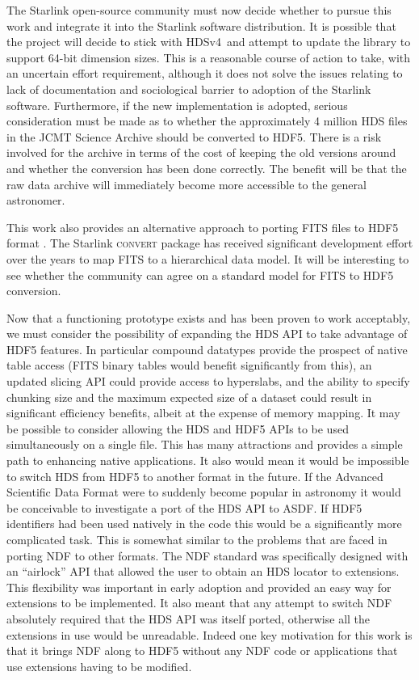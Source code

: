 \documentclass[final,authoryear,5p,times,twocolumn]{elsarticle}
\newcommand{\old}{HDSv4}
\begin{document}
The Starlink open-source community must now decide
whether to pursue this work and integrate it into the Starlink
software distribution. It is
possible that the project will decide to stick with \old\ and attempt
to update the library to support 64-bit dimension sizes. This is a
reasonable course of action to take, with an uncertain effort
requirement, although it does not solve the issues relating to lack of
documentation and sociological barrier to adoption of the Starlink
software. Furthermore, if the new implementation is adopted, serious
consideration must be made as to whether the approximately 4 million
HDS files in the JCMT Science Archive \citep{2015Economou} should be
converted to HDF5. There is a risk involved for the archive in terms
of the cost of keeping the old versions around and whether the
conversion has been done correctly. The benefit will be that the
raw data archive will immediately become more accessible to the
general astronomer.

This work also provides an alternative approach to porting FITS files to
HDF5 format \citep[see e.g.,][for other options]{O4-4_adassxxiv}. The Starlink
\textsc{convert} package \citep{1997STARB..19...14C,SUN55} has
received significant development effort over the years to map FITS to
a hierarchical data model. It will be interesting to see whether the
community can agree on a standard model for FITS to HDF5 conversion.

Now that a functioning prototype exists and has been proven to work
acceptably, we must consider the possibility of expanding the HDS API
to take advantage of HDF5 features. In particular compound datatypes
provide the prospect of native table access (FITS binary tables would
benefit significantly from this), an updated slicing API could provide
access to hyperslabs, and the ability to specify chunking size and the
maximum expected size of a dataset could result in significant
efficiency benefits, albeit at the expense of memory mapping. It may
be possible to consider allowing the HDS and HDF5 APIs to be used
simultaneously on a single file. This has many attractions and
provides a simple path to enhancing native applications. It also would
mean it would be impossible to switch HDS from HDF5 to another format
in the future. If the Advanced Scientific Data Format
\citep[ASDF;][]{asdf,2015Greenfield} were to suddenly become popular in astronomy it would be
conceivable to investigate a port of the HDS API to ASDF. If HDF5
identifiers had been used natively in the code this would be a
significantly more complicated task. This is somewhat similar to the
problems that are faced in porting NDF to other formats. The NDF
standard \citep{SGP38} was specifically designed with an ``airlock''
API that allowed the user to obtain an HDS locator to extensions. This
flexibility was important in early adoption and provided an easy way
for extensions to be implemented. It also meant that any attempt to
switch NDF absolutely required that the HDS API was itself ported,
otherwise all the extensions in use would be unreadable. Indeed one key
motivation for this work is that it brings NDF along to HDF5 without
any NDF code or applications that use extensions having to be
modified.
\end{document}
